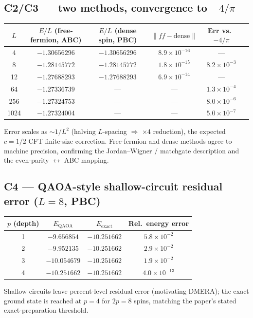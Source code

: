 \documentclass[11pt]{article}
\begin{document}
\subsection*{C2/C3 --- two methods, convergence to $-4/\pi$}
\begin{center}
\begin{tabular}{cccccc}
\toprule
$L$ & $E/L$ (free-fermion, ABC) & $E/L$ (dense spin, PBC) & $\|ff - \text{dense}\|$ & Err vs.\ $-4/\pi$ \\
\midrule
4    & $-1.30656296$ & $-1.30656296$ & $8.9\!\times\!10^{-16}$ & --- \\
8    & $-1.28145772$ & $-1.28145772$ & $1.8\!\times\!10^{-15}$ & $8.2\!\times\!10^{-3}$ \\
12   & $-1.27688293$ & $-1.27688293$ & $6.9\!\times\!10^{-14}$ & --- \\
64   & $-1.27336739$ & --- & --- & $1.3\!\times\!10^{-4}$ \\
256  & $-1.27324753$ & --- & --- & $8.0\!\times\!10^{-6}$ \\
1024 & $-1.27324004$ & --- & --- & $5.0\!\times\!10^{-7}$ \\
\bottomrule
\end{tabular}
\end{center}
Error scales as $\sim 1/L^2$ (halving $L$-spacing $\Rightarrow$ $\times 4$ reduction),
the expected $c=1/2$ CFT finite-size correction. Free-fermion and dense methods agree
to machine precision, confirming the Jordan--Wigner / matchgate description and the
even-parity $\leftrightarrow$ ABC mapping.

\subsection*{C4 --- QAOA-style shallow-circuit residual error ($L=8$, PBC)}
\begin{center}
\begin{tabular}{cccc}
\toprule
$p$ (depth) & $E_{\text{QAOA}}$ & $E_{\text{exact}}$ & Rel.\ energy error \\
\midrule
1 & $-9.656854$  & $-10.251662$ & $5.8\!\times\!10^{-2}$ \\
2 & $-9.952135$  & $-10.251662$ & $2.9\!\times\!10^{-2}$ \\
3 & $-10.054679$ & $-10.251662$ & $1.9\!\times\!10^{-2}$ \\
4 & $-10.251662$ & $-10.251662$ & $4.0\!\times\!10^{-13}$ \\
\bottomrule
\end{tabular}
\end{center}
Shallow circuits leave percent-level residual error (motivating DMERA); the exact
ground state is reached at $p=4$ for $2p=8$ spins, matching the paper's stated
exact-preparation threshold.
\end{document}
